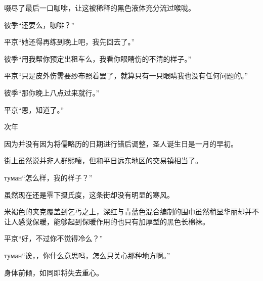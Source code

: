 \documentclass{article}
\begin{document}
啜尽了最后一口咖啡，让这被稀释的黑色液体充分流过喉咙。

彼季“还要么，咖啡？”

平京“她还得再练到晚上吧，我先回去了。”

彼季“用我帮你预定出租车么，我看你眼睛伤的不清的样子。”

平京“只是皮外伤需要纱布照着罢了，就算只有一只眼睛我也没有任何问题的。”

彼季“那你晚上八点过来就行。”

平京“恩，知道了。”

\centerline{次年}


因为并没有因为将儒略历的日期进行错后调整，圣人诞生日是一月的早初。

街上虽然说并非人群熙嚷，但和平日远东地区的交易镇相当了。

туман“怎么样，我的样子？”

虽然现在还是零下摄氏度，这条街却没有明显的寒风。

米褐色的夹克覆盖到乞丐之上，深红与青蓝色混合编制的围巾虽然稍显华丽却并不让人感觉保暖，能够起到保暖作用的也只有加厚型的黑色长棉袜。

平京“好，不过你不觉得冷么？”

туман“诶，，你什么意思吗，怎么只关心那种地方啊。”

身体前倾，如同即将失去重心。











\end{document}
